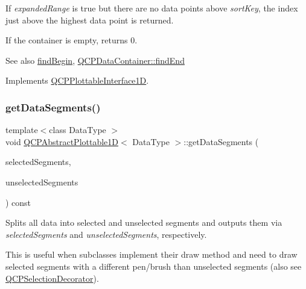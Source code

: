 If {\itshape expanded\+Range} is true but there are no data points above {\itshape sort\+Key}, the index just above the highest data point is returned.

If the container is empty, returns 0.

\begin{DoxySeeAlso}{See also}
\mbox{\hyperlink{class_q_c_p_abstract_plottable1_d_ae6ead74a0d6a17954e1857f361b9ccf2}{find\+Begin}}, \mbox{\hyperlink{class_q_c_p_data_container_afb8b8f23cc2b7234a793a25ce79fe48f}{Q\+C\+P\+Data\+Container\+::find\+End}} 
\end{DoxySeeAlso}


Implements \mbox{\hyperlink{class_q_c_p_plottable_interface1_d_a5deced1016bc55a41a2339619045b295}{Q\+C\+P\+Plottable\+Interface1D}}.

\mbox{\label{class_q_c_p_abstract_plottable1_d_ae890e62ce403c54f575c73b9529f1af8}} 
\subsubsection{\texorpdfstring{get\+Data\+Segments()}{getDataSegments()}}
{\footnotesize\ttfamily template$<$class Data\+Type $>$ \\
void \mbox{\hyperlink{class_q_c_p_abstract_plottable1_d}{Q\+C\+P\+Abstract\+Plottable1D}}$<$ Data\+Type $>$\+::get\+Data\+Segments (\begin{DoxyParamCaption}\item[{Q\+List$<$ \mbox{\hyperlink{class_q_c_p_data_range}{Q\+C\+P\+Data\+Range}} $>$ \&}]{selected\+Segments,  }\item[{Q\+List$<$ \mbox{\hyperlink{class_q_c_p_data_range}{Q\+C\+P\+Data\+Range}} $>$ \&}]{unselected\+Segments }\end{DoxyParamCaption}) const\hspace{0.3cm}{\ttfamily [protected]}}

Splits all data into selected and unselected segments and outputs them via {\itshape selected\+Segments} and {\itshape unselected\+Segments}, respectively.

This is useful when subclasses implement their draw method and need to draw selected segments with a different pen/brush than unselected segments (also see \mbox{\hyperlink{class_q_c_p_selection_decorator}{Q\+C\+P\+Selection\+Decorator}}).

